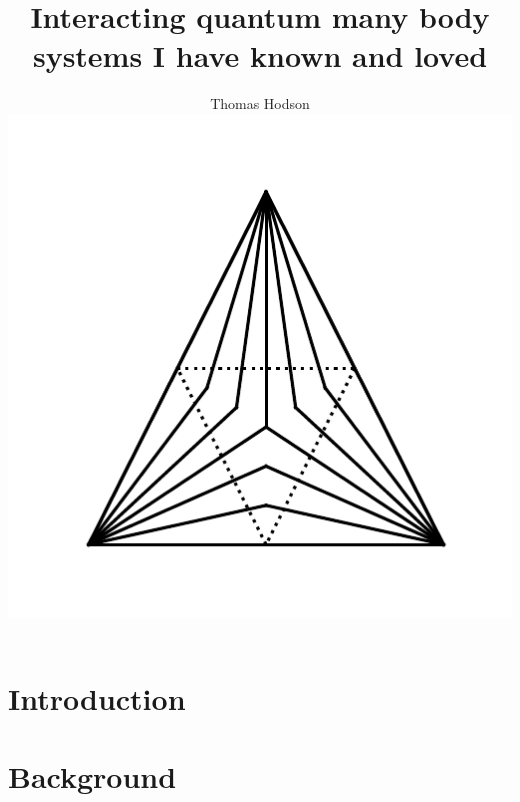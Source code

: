\documentclass[a4paper,12pt]{report}
\begin{document}
\title{\LARGE {\bf Interacting quantum many body systems I have known and loved}\\
 \vspace*{6mm}
}

\author{Thomas Hodson\\\vspace{10mm}
\includegraphics[width=.4\textwidth,height=.4\textheight]{figure_code/logo/logo}
\vspace{-0.4\textheight}
\vspace{10mm}
}


\maketitle

\preface



% 
% 

\body

\hypersetup{
  linkcolor  = urlblue,
  citecolor  = black,
  urlcolor   = urlblue,
  }

\hypertarget{chap:1-introduction}{\chapter{Introduction}}
\begin{refsection}

\printbibliography[heading=subbibintoc]
\end{refsection}

\hypertarget{chap:2-background}{\chapter{Background}}
\begin{refsection}




\printbibliography[heading=subbibintoc]
\end{refsection}
\end{document}
